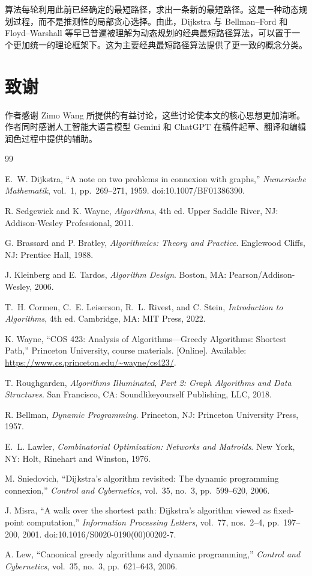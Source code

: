\documentclass[UTF8,11pt,a4paper]{ctexart}
\begin{document}
算法每轮利用此前已经确定的最短路径，求出一条新的最短路径。这是一种动态规划过程，而不是推测性的局部贪心选择。由此，Dijkstra 与 Bellman--Ford 和 Floyd--Warshall 等早已普遍被理解为动态规划的经典最短路径算法，可以置于一个更加统一的理论框架下\cite{CLRS2022}。这为主要经典最短路径算法提供了更一致的概念分类。

\section*{致谢}
作者感谢 Zimo Wang 所提供的有益讨论，这些讨论使本文的核心思想更加清晰。作者同时感谢人工智能大语言模型 Gemini 和 ChatGPT 在稿件起草、翻译和编辑润色过程中提供的辅助。

\begin{thebibliography}{99}

E.~W. Dijkstra,
``A note on two problems in connexion with graphs,''
\emph{Numerische Mathematik}, vol.~1, pp.~269--271, 1959.
doi:10.1007/BF01386390.

R. Sedgewick and K. Wayne,
\emph{Algorithms}, 4th ed.
Upper Saddle River, NJ: Addison-Wesley Professional, 2011.

G. Brassard and P. Bratley,
\emph{Algorithmics: Theory and Practice}.
Englewood Cliffs, NJ: Prentice Hall, 1988.

J. Kleinberg and E. Tardos,
\emph{Algorithm Design}.
Boston, MA: Pearson/Addison-Wesley, 2006.

T.~H. Cormen, C.~E. Leiserson, R.~L. Rivest, and C. Stein,
\emph{Introduction to Algorithms}, 4th ed.
Cambridge, MA: MIT Press, 2022.

K. Wayne,
``COS 423: Analysis of Algorithms---Greedy Algorithms: Shortest Path,''
Princeton University, course materials.
[Online]. Available: \url{https://www.cs.princeton.edu/~wayne/cs423/}.

T. Roughgarden,
\emph{Algorithms Illuminated, Part 2: Graph Algorithms and Data Structures}.
San Francisco, CA: Soundlikeyourself Publishing, LLC, 2018.

R. Bellman,
\emph{Dynamic Programming}.
Princeton, NJ: Princeton University Press, 1957.

E.~L. Lawler,
\emph{Combinatorial Optimization: Networks and Matroids}.
New York, NY: Holt, Rinehart and Winston, 1976.

M. Sniedovich,
``Dijkstra's algorithm revisited: The dynamic programming connexion,''
\emph{Control and Cybernetics}, vol.~35, no.~3, pp.~599--620, 2006.

J. Misra,
``A walk over the shortest path: Dijkstra's algorithm viewed as fixed-point computation,''
\emph{Information Processing Letters}, vol.~77, nos.~2--4, pp.~197--200, 2001.
doi:10.1016/S0020-0190(00)00202-7.

A. Lew,
``Canonical greedy algorithms and dynamic programming,''
\emph{Control and Cybernetics}, vol.~35, no.~3, pp.~621--643, 2006.

\end{thebibliography}
\end{document}
